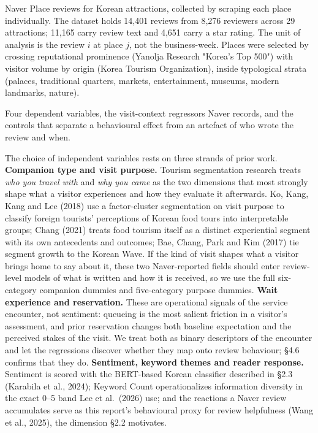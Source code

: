 \documentclass[10pt,a4paper]{article}
\newcommand{\sect}[1]{\vspace{10pt}\noindent{\Large\bfseries #1}\par\vspace{3pt}}
\newcommand{\subsect}[1]{\vspace{6pt}\noindent{\large\bfseries #1}\par\vspace{2pt}}
\begin{document}
\sect{III. Methodology}

\subsect{3.1 Data}
Naver Place reviews for Korean attractions, collected by scraping each place
individually. The dataset holds 14,401 reviews from 8,276 reviewers across
29 attractions; 11,165 carry review text and 4,651 carry a star rating. The
unit of analysis is the review $i$ at place $j$, not the business-week.
Places were selected by crossing reputational prominence (Yanolja Research
"Korea's Top 500") with visitor volume by origin (Korea Tourism
Organization), inside typological strata (palaces, traditional quarters,
markets, entertainment, museums, modern landmarks, nature).

\subsect{3.2 Variables}
Four dependent variables, the visit-context regressors Naver records, and
the controls that separate a behavioural effect from an artefact of who
wrote the review and when.

\tblVariables

The choice of independent variables rests on three strands of prior work.
\textbf{Companion type and visit purpose.} Tourism segmentation research
treats \emph{who you travel with} and \emph{why you came} as the two
dimensions that most strongly shape what a visitor experiences and how
they evaluate it afterwards. Ko, Kang, Kang and Lee (2018) use a
factor-cluster segmentation on visit purpose to classify foreign tourists'
perceptions of Korean food tours into interpretable groups; Chang (2021)
treats food tourism itself as a distinct experiential segment with its own
antecedents and outcomes; Bae, Chang, Park and Kim (2017) tie segment
growth to the Korean Wave. If the kind of visit shapes what a visitor
brings home to say about it, these two Naver-reported fields should enter
review-level models of what is written and how it is received, so we use
the full six-category companion dummies and five-category purpose dummies.
\textbf{Wait experience and reservation.} These are operational signals
of the service encounter, not sentiment: queueing is the most salient
friction in a visitor's assessment, and prior reservation changes both
baseline expectation and the perceived stakes of the visit. We treat both
as binary descriptors of the encounter and let the regressions discover
whether they map onto review behaviour; \S4.6 confirms that they do.
\textbf{Sentiment, keyword themes and reader response.} Sentiment is scored
with the BERT-based Korean classifier described in \S2.3 (Karabila et al.,
2024); Keyword Count operationalizes information diversity in the exact
0--5 band Lee et al.\ (2026) use; and the reactions a Naver review
accumulates serve as this report's behavioural proxy for review helpfulness
(Wang et al., 2025), the dimension \S2.2 motivates.
\end{document}
